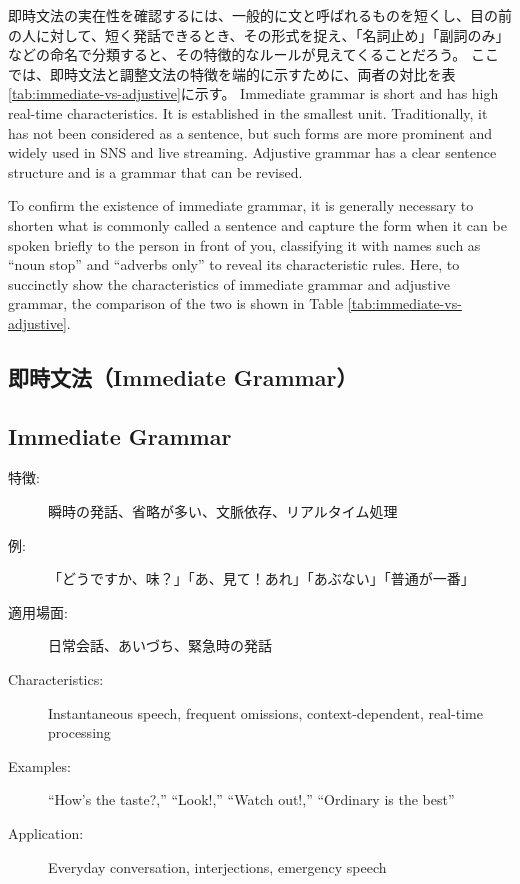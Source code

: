 \documentclass[a4paper,xelatex,ja=standard]{bxjsarticle}
\begin{document}
即時文法の実在性を確認するには、一般的に文と呼ばれるものを短くし、目の前の人に対して、短く発話できるとき、その形式を捉え、「名詞止め」「副詞のみ」などの命名で分類すると、その特徴的なルールが見えてくることだろう。
ここでは、即時文法と調整文法の特徴を端的に示すために、両者の対比を表\ref{tab:immediate-vs-adjustive}に示す。
\else
Immediate grammar is short and has high real-time characteristics. It is established in the smallest unit.
Traditionally, it has not been considered as a sentence, but such forms are more prominent and widely used in SNS and live streaming.
Adjustive grammar has a clear sentence structure and is a grammar that can be revised.

To confirm the existence of immediate grammar, it is generally necessary to shorten what is commonly called a sentence and capture the form when it can be spoken briefly to the person in front of you, classifying it with names such as ``noun stop'' and ``adverbs only'' to reveal its characteristic rules.
Here, to succinctly show the characteristics of immediate grammar and adjustive grammar, the comparison of the two is shown in Table \ref{tab:immediate-vs-adjustive}.
\fi

\ifJPN
  \subsection{即時文法（Immediate Grammar）}
\else
  \subsection{Immediate Grammar}
\fi

\ifJPN
  \begin{description}
   \item[特徴:] 瞬時の発話、省略が多い、文脈依存、リアルタイム処理
\item[例:] 「どうですか、味？」「あ、見て！あれ」「あぶない」「普通が一番」
\item[適用場面:] 日常会話、あいづち、緊急時の発話
  \end{description}
\else
  \begin{description}
    \item[Characteristics:] Instantaneous speech, frequent omissions, context-dependent, real-time processing
    \item[Examples:] ``How's the taste?,'' ``Look!,'' ``Watch out!,'' ``Ordinary is the best''
    \item[Application:] Everyday conversation, interjections, emergency speech
  \end{description}
\fi
\end{document}
